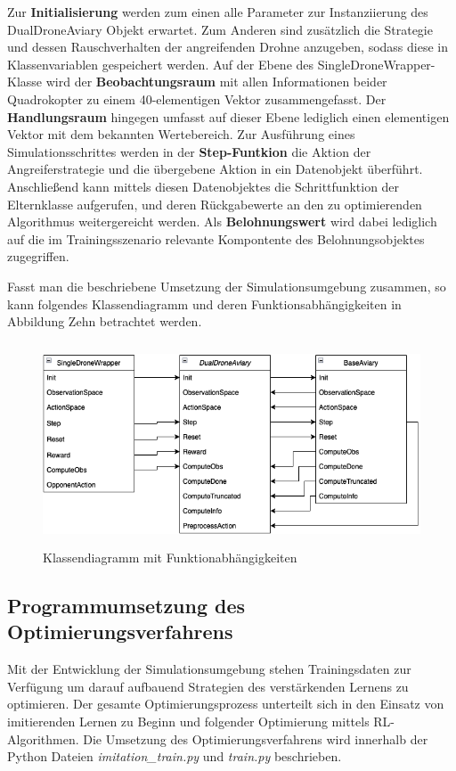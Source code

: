 Zur \textbf{Initialisierung} werden zum einen alle Parameter zur Instanziierung des DualDroneAviary Objekt erwartet.
Zum Anderen sind zusätzlich die Strategie und dessen Rauschverhalten der angreifenden Drohne anzugeben, sodass diese in Klassenvariablen gespeichert werden.
Auf der Ebene des SingleDroneWrapper-Klasse wird der \textbf{Beobachtungsraum} mit allen Informationen beider Quadrokopter zu einem 40-elementigen Vektor zusammengefasst.
Der \textbf{Handlungsraum} hingegen umfasst auf dieser Ebene lediglich einen elementigen Vektor mit dem bekannten Wertebereich.
Zur Ausführung eines Simulationsschrittes werden in der \textbf{Step-Funtkion} die Aktion der Angreiferstrategie und die übergebene Aktion in ein Datenobjekt überführt.
Anschließend kann mittels diesen Datenobjektes die Schrittfunktion der Elternklasse aufgerufen, und deren Rückgabewerte an den zu optimierenden Algorithmus weitergereicht werden.
Als \textbf{Belohnungswert} wird dabei lediglich auf die im Trainingsszenario relevante Kompontente des Belohnungsobjektes zugegriffen.

Fasst man die beschriebene Umsetzung der Simulationsumgebung zusammen, so kann folgendes Klassendiagramm und deren Funktionsabhängigkeiten in Abbildung Zehn betrachtet werden.

\begin{figure}[htb]
    \centering
    \includegraphics[height=6cm]{lib/graphics/simenv structure.png}
    \caption[Klassendiagramm mit Funktionabhängigkeiten]{Klassendiagramm mit Funktionabhängigkeiten\footnotemark}
    \label{abb:drone axis}
\end{figure}

\subsection{Programmumsetzung des Optimierungsverfahrens}

Mit der Entwicklung der Simulationsumgebung stehen Trainingsdaten zur Verfügung um darauf aufbauend Strategien des verstärkenden Lernens zu optimieren.
Der gesamte Optimierungsprozess unterteilt sich in den Einsatz von imitierenden Lernen zu Beginn und folgender Optimierung mittels RL-Algorithmen. 
Die Umsetzung des Optimierungsverfahrens wird innerhalb der Python Dateien \textit{imitation\_train.py} und \textit{train.py} beschrieben.

